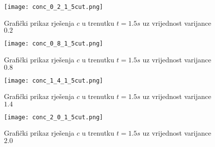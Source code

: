 \documentclass[a4paper,12pt]{article}
\begin{document}
\begin{figure}[h!t]
\begin{center}
\texttt{[image: conc\_0\_2\_1\_5cut.png]}
\caption{Grafički prikaz rješenja $c$ u trenutku $t = 1.5s$ uz vrijednost varijance $0.2$}
\label{fig:02}
\end{center}
\end{figure}

\begin{figure}[h!t]
\begin{center}
\texttt{[image: conc\_0\_8\_1\_5cut.png]}
\caption{Grafički prikaz rješenja $c$ u trenutku $t = 1.5s$ uz vrijednost varijance $0.8$}
\label{fig:08}
\end{center}
\end{figure}

\begin{figure}[h!t]
\begin{center}
\texttt{[image: conc\_1\_4\_1\_5cut.png]}
\caption{Grafički prikaz rješenja $c$ u trenutku $t = 1.5s$ uz vrijednost varijance $1.4$}
\label{fig:14}
\end{center}
\end{figure}

\begin{figure}[h!t]
\begin{center}
\texttt{[image: conc\_2\_0\_1\_5cut.png]}
\caption{Grafički prikaz rješenja $c$ u trenutku $t = 1.5s$ uz vrijednost varijance $2.0$}
\label{fig:20}
\end{center}
\end{figure}
\end{document}
